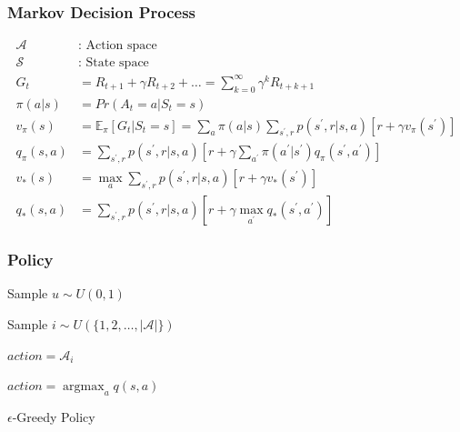\documentclass{beamer}
\newcommand{\nextstate}{s^\prime}
\newcommand{\nextaction}{a^\prime}
\newcommand{\actionspace}{\mathcal{A}}
\newcommand{\statespace}{\mathcal{S}}
\newcommand{\expectation}{\mathbb{E}}
\DeclareMathOperator*{\argmax}{argmax}
\begin{document}
    \begin{frame}
        \frametitle{Markov Decision Process}

        \small
        \begin{align*}
            \actionspace & \text{: Action space} \\
            \statespace & \text{: State space} \\
            G_t &= R_{t + 1} + \gamma R_{t + 2} + \ldots = \sum_{k = 0}^{\infty} \gamma^k R_{t + k + 1} \\
            \pi(a | s) &= Pr(A_t = a | S_t = s) \\
            v_{\pi}(s) &= \expectation_\pi \left[ G_t \bigg\rvert S_t = s \right]
            = \sum_a \pi(a | s) \sum_{\nextstate, r} p(\nextstate, r | s, a) \left[ r + \gamma v_\pi(\nextstate) \right] \\
            q_{\pi}(s, a) &= \sum_{\nextstate, r} p(\nextstate, r | s, a) \left[ r + \gamma \sum_{\nextaction} \pi(\nextaction | \nextstate) q_\pi(\nextstate, \nextaction) \right] \\
            v_{\ast}(s) &= \max_a \sum_{\nextstate, r} p(\nextstate, r | s, a) \left[ r + \gamma v_\ast(\nextstate) \right] \\
            q_{\ast}(s, a) &= \sum_{\nextstate, r} p(\nextstate, r | s, a) \left[ r + \gamma \max_{\nextaction} q_\ast(\nextstate, \nextaction) \right]
        \end{align*}
        \normalsize
    \end{frame}

    \begin{frame}
        \frametitle{Policy}

        \begin{algorithm}[H]
            Sample $u \sim U(0, 1)$

            {
            Sample $i \sim U(\{ 1, 2, \ldots, |\actionspace| \})$

            $action = \actionspace_i$
            }
            {
            $action = \displaystyle\argmax_a q(s, a)$
            }

            \caption{$\epsilon$-Greedy Policy}
            \label{alg:epsilon_greedy_policy}
        \end{algorithm}
    \end{frame}
\end{document}
